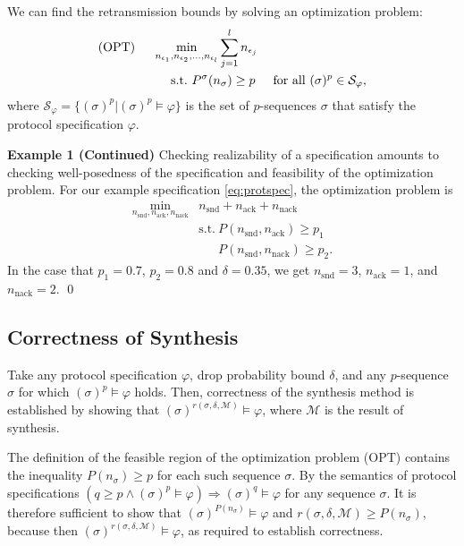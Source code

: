\documentclass{sig-alternate}
\newenvironment{excont}[1]{\textbf{Example 1 (#1)}}{\qed}
\renewcommand{\v}{\varphi}
\newcommand{\e}{\epsilon}
\renewcommand{\d}{\delta}
\newcommand{\M}{\mathcal{M}}
\newcommand{\snd}{\mathrm{snd}}
\newcommand{\ack}{\mathrm{ack}}
\newcommand{\nack}{\mathrm{nack}}
\begin{document}
We can find the retransmission bounds by solving an optimization problem:
\begin{align*}
	\text{(OPT)}\hspace{0.5cm}&\min_{n_{\e_1}, n_{\e_2}, \ldots, n_{\e_l}} \sum_{j = 1}^{l} n_{\e_j}\\
	&\hspace{0.5cm}\text{s.t.}~P^\sigma(n_\sigma) \geq p \hspace{0.5cm}\text{for all}~ (\sigma)^p \in \mathcal{S_{\v}},
\end{align*}
where $\mathcal{S_{\v}} = \{ (\sigma)^p | (\sigma)^p \models \v\}$ is the set of $p$-sequences $\sigma$ that satisfy the protocol specification $\v$.

\begin{excont}{Continued}
Checking realizability of a specification amounts to checking well-posedness of the specification and feasibility of the optimization problem. For our example specification \eqref{eq:protspec}, the optimization problem is
\begin{align*}
	\min_{n_{\snd}, n_{\ack}, n_{\nack}} &n_{\snd} + n_{\ack} + n_{\nack}\\
	&\text{s.t.}~P(n_{\snd}, n_{\ack}) \geq p_1 \\
	&\phantom{\text{s.t.}}~P(n_{\snd}, n_{\nack}) \geq p_2.
\end{align*}
In the case that $p_1 = 0.7$, $p_2 = 0.8$ and $\d = 0.35$, we get $n_{\snd} = 3$, $n_{\ack} = 1$, and $n_{\nack} = 2$.
\end{excont}


\subsection{Correctness of Synthesis}

Take any protocol specification $\v$, drop probability bound $\d$, and any $p$-sequence $\sigma$ for which $(\sigma)^p \models \v$ holds. Then, correctness of the synthesis method is established by showing that $(\sigma)^{r(\sigma, \d, \M)} \models \v$, where $\M$ is the result of synthesis.

The definition of the feasible region of the optimization problem (OPT) contains the inequality $P(n_{\sigma}) \geq p$ for each such sequence $\sigma$. By the semantics of protocol specifications $(q \geq p \wedge (\sigma)^{p} \models \v) \Rightarrow (\sigma)^{q} \models \v$ for any sequence $\sigma$. It is therefore sufficient to show that $(\sigma)^{P(n_{\sigma})} \models \v$ and $r(\sigma, \d, \M) \geq P(n_\sigma)$, because then $(\sigma)^{r(\sigma, \d, \M)} \models \v$, as required to establish correctness.
\end{document}
